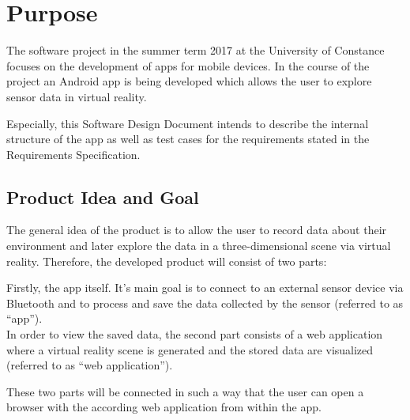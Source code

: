 \section{Purpose}

The software project in the summer term 2017 at the University of Constance focuses on the development of apps for mobile devices. In the course of the project an Android app is being developed which allows the user to explore sensor data in virtual reality.

Especially, this Software Design Document intends to describe the internal structure of the app as well as test cases for the requirements stated in the Requirements Specification.

\subsection{Product Idea and Goal}

The general idea of the product is to allow the user to record data about their environment and later explore the data in a three-dimensional scene via virtual reality. Therefore, the developed product will consist of two parts:

Firstly, the app itself. It's main goal is to connect to an external sensor device via Bluetooth and to process and save the data collected by the sensor (referred to as ``app''). \\
In order to view the saved data, the second part consists of a web application where a virtual reality scene is generated and the stored data are visualized (referred to as ``web application'').

These two parts will be connected in such a way that the user can open a browser with the according web application from within the app.






